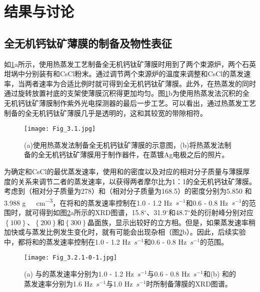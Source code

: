 \documentclass[forlib]{WHUMaster}   %
\def\degree{${}^{\circ}$} %
\begin{document}
{\section{结果与讨论}

\subsection{\texorpdfstring{{}全无机钙钛矿薄膜的制备及物性表征}{PDFstring}}

如\ref{fig:3.1}a所示，使用热蒸发工艺制备全无机钙钛矿薄膜时用到了两个束源炉，两个石英坩埚中分别装有和CsCl粉末。通过调节两个束源炉的温度来调整和CsCl的蒸发速率，当两者速率为合适比例时就可得到全无机钙钛矿薄膜。此外，在热蒸发的同时通过旋转放置衬底的支架使薄膜沉积得更加均匀。图\ref{fig:3.1}b为使用热蒸发法沉积的全无机钙钛矿薄膜制作紫外光电探测器的最后一步工艺。可以看出，通过热蒸发工艺制备的全无机钙钛矿薄膜几乎是透明的，这和其较宽的带隙相符。

\begin{figure}[htb]
\centering
  \texttt{[image: Fig\_3.1.jpg]}
  \caption{\rm (a)使用热蒸发法制备全无机钙钛矿薄膜的示意图，(b)将热蒸发法制备的全无机钙钛矿薄膜用于制作器件，在蒸镀Ag电极之后的照片。}
  \label{fig:3.1}
\end{figure}

为确定和CsCl的最优蒸发速率，使用和的密度以及对应的相对分子质量与薄膜厚度的关系来调节二者的蒸发速率，以获得两者摩尔比为1：1的全无机钙钛矿薄膜。考虑到（相对分子质量为278）和（相对分子质量为168.5）的密度分别为5.850 和3.988 \si{g \ cm^{-3}}，在将和的蒸发速率控制在1.0 - 1.2 Hz\ $\si{s^{-1}}$和0.6 - 0.8 Hz\ $\si{s^{-1}}$的范围时，就可得到如图\ref{fig:3.2.0}a所示的XRD图谱，15.8{\degree}、31.9{\degree}和48.7{\degree}处的衍射峰分别对应$\left\{\num{100}\right\}$、$\left\{\num{200}\right\}$和$\left\{\num{300}\right\}$晶面族，显示出较好的立方相\cite{RN137,RN101,RN119}。但是，如果蒸发速率稍加快或与蒸发比例发生变化时，就有可能会出现杂相（图\ref{fig:3.2.0}b）。因此，后续实验中，都将和的蒸发速率控制在1.0 - 1.2 Hz\ $\si{s^{-1}}$和0.6 - 0.8 Hz\ $\si{s^{-1}}$的范围。

\begin{figure}[ht]
\centering
  \texttt{[image: Fig\_3.2.1-0-1.jpg]}
  \caption{\rm (a) 与的蒸发速率分别为1.0 - 1.2 Hz\ $\si{s^{-1}}$与0.6 - 0.8 Hz\ $\si{s^{-1}}$和(b) 和的蒸发速率分别为1.6 Hz\ $\si{s^{-1}}$与1.0 Hz\ $\si{s^{-1}}$时所制备薄膜的XRD图谱。}
  \label{fig:3.2.0}
\end{figure}

}
\end{document}
